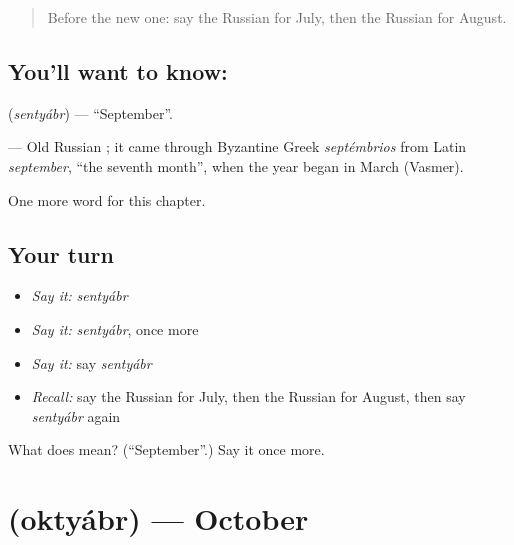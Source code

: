 \label{lesson:RU-C212-sentyabr}



\begin{quote}
Before the new one: say the Russian for July, then the Russian for August.
\end{quote}

\subsection*{You'll want to know: }
\textbf{} (\emph{sentyábr}) — \textquotedblleft{}September\textquotedblright{}.

\begin{cousinweb}
\textbf{} — Old Russian \emph{}; it came through Byzantine Greek \emph{septémbrios} from Latin \emph{september}, \textquotedblleft{}the seventh month\textquotedblright{}, when the year began in March (Vasmer).
\end{cousinweb}

\begin{grammarlens}[title={What you've built}]
One more word for this chapter.
\end{grammarlens}

\subsection*{Your turn}
\begin{itemize}
\raggedright
  \item \emph{Say it:} \emph{sentyábr}
  \item \emph{Say it:} \emph{sentyábr}, once more
  \item \emph{Say it:} say \emph{sentyábr}
  \item \emph{Recall:} say the Russian for July, then the Russian for August, then say \emph{sentyábr} again
\end{itemize}

\begin{tcolorbox}[breakable,colback=teal!4,colframe=teal!35!black,title={Before you move on}]
What does  mean? (\textquotedblleft{}September\textquotedblright{}.) Say it once more.
\end{tcolorbox}
\section[\texorpdfstring{\ru{октябрь} (oktyábr)}{октябрь (oktyábr)}]{ (oktyábr) — October}

